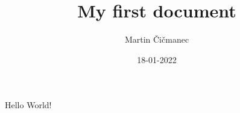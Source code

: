 \documentclass{article}
\title{My first document}
\date{18-01-2022}
\author{Martin Čičmanec}
\begin{document}
    \maketitle
    Hello World!
\end{document}
